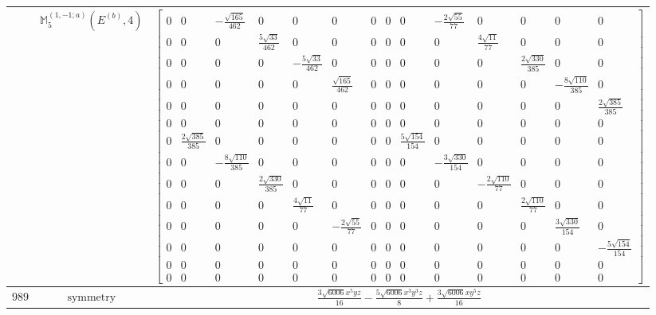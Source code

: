 \documentclass[fleqn,8pt,landscape]{jsarticle}
\begin{document}
\begin{longtable}{ccc}
$  $ & $ \mathbb{M}_{5}^{(1,-1;a)}(E^{(b)},4) $ & $ \begin{bmatrix} 0 & 0 & - \frac{\sqrt{165}}{462} & 0 & 0 & 0 & 0 & 0 & 0 & - \frac{2 \sqrt{55}}{77} & 0 & 0 & 0 & 0 \\ 0 & 0 & 0 & \frac{5 \sqrt{33}}{462} & 0 & 0 & 0 & 0 & 0 & 0 & \frac{4 \sqrt{11}}{77} & 0 & 0 & 0 \\ 0 & 0 & 0 & 0 & - \frac{5 \sqrt{33}}{462} & 0 & 0 & 0 & 0 & 0 & 0 & \frac{2 \sqrt{330}}{385} & 0 & 0 \\ 0 & 0 & 0 & 0 & 0 & \frac{\sqrt{165}}{462} & 0 & 0 & 0 & 0 & 0 & 0 & - \frac{8 \sqrt{110}}{385} & 0 \\ 0 & 0 & 0 & 0 & 0 & 0 & 0 & 0 & 0 & 0 & 0 & 0 & 0 & \frac{2 \sqrt{385}}{385} \\ 0 & 0 & 0 & 0 & 0 & 0 & 0 & 0 & 0 & 0 & 0 & 0 & 0 & 0 \\ 0 & \frac{2 \sqrt{385}}{385} & 0 & 0 & 0 & 0 & 0 & 0 & \frac{5 \sqrt{154}}{154} & 0 & 0 & 0 & 0 & 0 \\ 0 & 0 & - \frac{8 \sqrt{110}}{385} & 0 & 0 & 0 & 0 & 0 & 0 & - \frac{3 \sqrt{330}}{154} & 0 & 0 & 0 & 0 \\ 0 & 0 & 0 & \frac{2 \sqrt{330}}{385} & 0 & 0 & 0 & 0 & 0 & 0 & - \frac{2 \sqrt{110}}{77} & 0 & 0 & 0 \\ 0 & 0 & 0 & 0 & \frac{4 \sqrt{11}}{77} & 0 & 0 & 0 & 0 & 0 & 0 & \frac{2 \sqrt{110}}{77} & 0 & 0 \\ 0 & 0 & 0 & 0 & 0 & - \frac{2 \sqrt{55}}{77} & 0 & 0 & 0 & 0 & 0 & 0 & \frac{3 \sqrt{330}}{154} & 0 \\ 0 & 0 & 0 & 0 & 0 & 0 & 0 & 0 & 0 & 0 & 0 & 0 & 0 & - \frac{5 \sqrt{154}}{154} \\ 0 & 0 & 0 & 0 & 0 & 0 & 0 & 0 & 0 & 0 & 0 & 0 & 0 & 0 \\ 0 & 0 & 0 & 0 & 0 & 0 & 0 & 0 & 0 & 0 & 0 & 0 & 0 & 0 \end{bmatrix} $ \\ \hline
$ 989 $ & $ \text{symmetry} $ & $ \frac{3 \sqrt{6006} x^{5} y z}{16} - \frac{5 \sqrt{6006} x^{3} y^{3} z}{8} + \frac{3 \sqrt{6006} x y^{5} z}{16} $ \\

\end{longtable}
\end{document}
